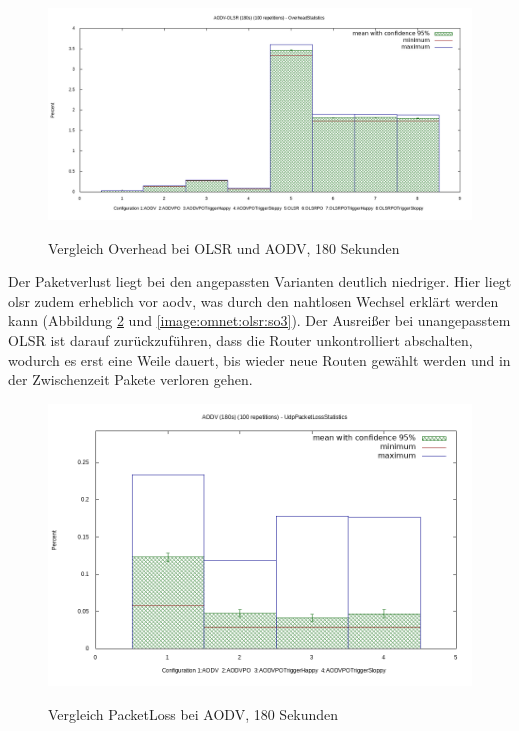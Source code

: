 \begin{figure}
  \centering
  \includegraphics[scale=0.45]{bilder/c2.png} \\
  \caption{Vergleich Overhead bei OLSR und AODV, 180 Sekunden}
  \label{image:omnet:olsr:comp2}
\end{figure}

Der Paketverlust liegt bei den angepassten Varianten deutlich niedriger. Hier liegt \gls{olsr} zudem erheblich vor \gls{aodv}, was durch den nahtlosen Wechsel erklärt werden kann (\vgl Abbildung \ref{image:omnet:olsr:sa3} und \ref{image:omnet:olsr:so3}). Der Ausreißer bei unangepasstem OLSR ist darauf zurückzuführen, dass die Router unkontrolliert abschalten, wodurch es erst eine Weile dauert, bis wieder neue Routen gewählt werden und in der Zwischenzeit Pakete verloren gehen.

\begin{figure}
  \centering
  \includegraphics[scale=0.55]{bilder/sa3.png} \\
  \caption{Vergleich PacketLoss bei AODV, 180 Sekunden}
  \label{image:omnet:olsr:sa3}
\end{figure}

